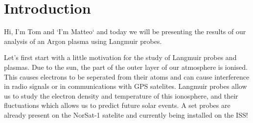\section{Introduction}




Hi, I'm Tom and `I'm Matteo` and today we will be presenting the results of our analysis of an Argon plasma using Langmuir probes.

Let's first start with a little motivation for the study of Langmuir probes and plasmas. Due to the sun, the part of the outer layer of our atmosphere is ionised. This causes electrons to be seperated from their atoms and can cause interference in radio signals or in communications with GPS satelites. Langmuir probes allow us to study the electron density and temperature of this ionosphere, and their fluctuations which allows us to predict future solar events. A set probes are already present on the NorSat-1 satelite and currently being installed on the ISS!
